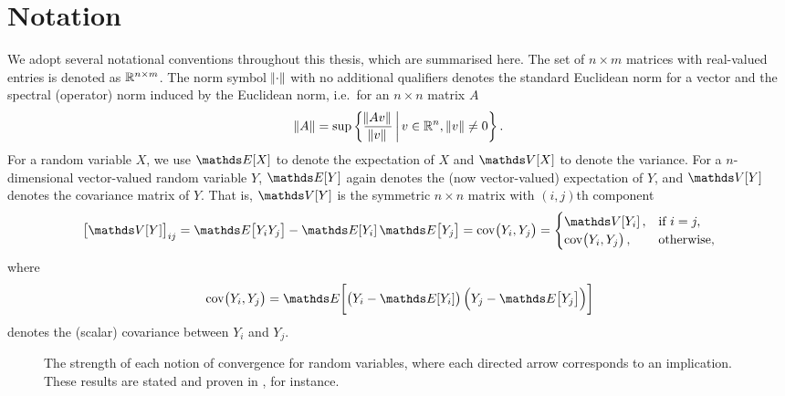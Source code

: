 \section{Notation}
We adopt several notational conventions throughout this thesis, which are summarised here.
The set of \(n \times m\) matrices with real-valued entries is denoted as \(\mathbb{R}^{n\times m}\).
The norm symbol \(\norm{\cdot}\) with no additional qualifiers denotes the standard Euclidean norm for a vector and the spectral (operator) norm induced by the Euclidean norm, i.e.\ for an \(n \times n\) matrix \(A\)
\[
	\norm{A} = \sup\left\{\frac{\norm{Av}}{\norm{v}}\,\middle|\,v \in \mathbb{R}^n, \, \norm{v} \neq 0\right\}.
\]
For a random variable \(X\), we use \(\avg{X}\) to denote the expectation of \(X\) and \(\var{X}\) to denote the variance.
For a \(n\)-dimensional vector-valued random variable \(Y\), \(\avg{Y}\) again denotes the (now vector-valued) expectation of \(Y\), and \(\var{Y}\) denotes the covariance matrix of \(Y\).
That is, \(\var{Y}\) is the symmetric \(n\times n\) matrix with \((i,j)\)th component
\[
	\left[\var{Y}\right]_{ij} = \avg{Y_iY_j} - \avg{Y_i}\avg{Y_j} = \cov{Y_i, Y_j} = \begin{cases}
		\var{Y_i},      & \text{if } i = j, \\
		\cov{Y_i, Y_j}, & \text{otherwise},
	\end{cases}
\]
where
\[
	\cov{Y_i, Y_j} = \avg{\left(Y_i - \avg{Y_i}\right)\left(Y_j - \avg{Y_j}\right)}
\]
denotes the (scalar) covariance between \(Y_i\) and \(Y_j\).

\begin{figure}
	\centering
		\caption{The strength of each notion of convergence for random variables, where each directed arrow corresponds to an implication.
			These results are stated and proven in \citet{Bremaud_2020_ProbabilityTheoryStochastic}, for instance.}
		\label{fig:rv_conv_impl}
\end{figure}

